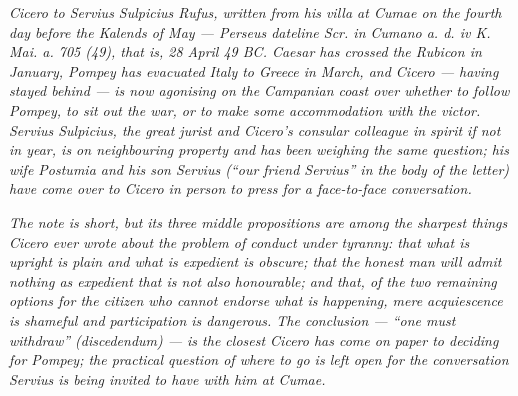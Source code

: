
\textit{Cicero to Servius Sulpicius Rufus, written from his
villa at Cumae on the fourth day before the Kalends of May ---
Perseus dateline \textit{Scr. in Cumano a. d. iv K. Mai. a.
705 (49)}, that is, 28 April 49 BC. Caesar has crossed the
Rubicon in January, Pompey has evacuated Italy to Greece in
March, and Cicero --- having stayed behind --- is now agonising
on the Campanian coast over whether to follow Pompey, to
sit out the war, or to make some accommodation with the
victor. Servius Sulpicius, the great jurist and Cicero's
consular colleague in spirit if not in year, is on
neighbouring property and has been weighing the same
question; his wife Postumia and his son Servius (``our friend
Servius'' in the body of the letter) have come over to Cicero
in person to press for a face-to-face conversation.}

\textit{The note is short, but its three middle propositions
are among the sharpest things Cicero ever wrote about the
problem of conduct under tyranny: that what is upright is
plain and what is expedient is obscure; that the honest man
will admit nothing as expedient that is not also honourable;
and that, of the two remaining options for the citizen who
cannot endorse what is happening, mere acquiescence is shameful
and participation is dangerous. The conclusion --- ``one must
withdraw'' (\textit{discedendum}) --- is the closest Cicero has
come on paper to deciding for Pompey; the practical question
of \textit{where} to go is left open for the conversation
Servius is being invited to have with him at Cumae.}
